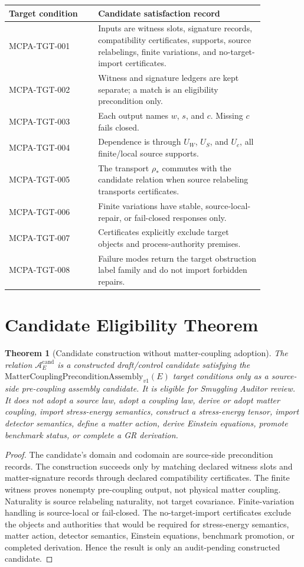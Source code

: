 \documentclass[11pt]{article}
\newcommand{\MCPA}{\mathrm{MatterCouplingPreconditionAssembly}_{v1}}
\newtheorem{theorem}{Theorem}
\begin{document}
\begin{longtable}{p{0.30\linewidth}p{0.56\linewidth}}
\toprule
Target condition & Candidate satisfaction record \\
\midrule
MCPA-TGT-001 & Inputs are witness slots, signature records, compatibility certificates, supports, source relabelings, finite variations, and no-target-import certificates. \\
MCPA-TGT-002 & Witness and signature ledgers are kept separate; a match is an eligibility precondition only. \\
MCPA-TGT-003 & Each output names \(w\), \(s\), and \(c\). Missing \(c\) fails closed. \\
MCPA-TGT-004 & Dependence is through \(U_W\), \(U_S\), and \(U_c\), all finite/local source supports. \\
MCPA-TGT-005 & The transport \(\rho_*\) commutes with the candidate relation when source relabeling transports certificates. \\
MCPA-TGT-006 & Finite variations have stable, source-local-repair, or fail-closed responses only. \\
MCPA-TGT-007 & Certificates explicitly exclude target objects and process-authority premises. \\
MCPA-TGT-008 & Failure modes return the target obstruction label family and do not import forbidden repairs. \\
\bottomrule
\end{longtable}

\section{Candidate Eligibility Theorem}

\begin{theorem}[Candidate construction without matter-coupling adoption]
The relation \(\mathcal{A}^{\mathrm{cand}}_E\) is a constructed
draft/control candidate satisfying the \(\MCPA(E)\) target conditions only as
a source-side pre-coupling assembly candidate. It is eligible for Smuggling
Auditor review. It does not adopt a source law, adopt a coupling law, derive
or adopt matter coupling, import stress-energy semantics, construct a
stress-energy tensor, import detector semantics, define a matter action,
derive Einstein equations, promote benchmark status, or complete a GR
derivation.
\end{theorem}

\begin{proof}
The candidate's domain and codomain are source-side precondition records. The
construction succeeds only by matching declared witness slots and
matter-signature records through declared compatibility certificates. The
finite witness proves nonempty pre-coupling output, not physical matter
coupling. Naturality is source relabeling naturality, not target covariance.
Finite-variation handling is source-local or fail-closed. The no-target-import
certificates exclude the objects and authorities that would be required for
stress-energy semantics, matter action, detector semantics, Einstein
equations, benchmark promotion, or completed derivation. Hence the result is
only an audit-pending constructed candidate.
\end{proof}
\end{document}

